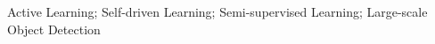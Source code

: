 \documentclass[journal]{IEEEtran}
\begin{document}
\begin{IEEEkeywords}
Active Learning; Self-driven Learning; Semi-supervised Learning; Large-scale Object Detection 
\end{IEEEkeywords}



%
\IEEEpeerreviewmaketitle



\end{document}
